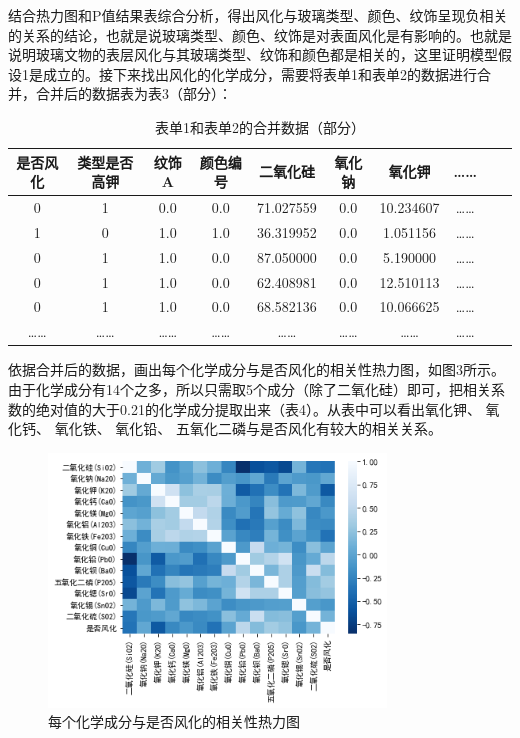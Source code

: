 \documentclass[withoutpreface,bwprint]{cumcmthesis}%
\begin{document}
	结合热力图和P值结果表综合分析，得出风化与玻璃类型、颜色、纹饰呈现负相关的关系的结论，也就是说玻璃类型、颜色、纹饰是对表面风化是有影响的。也就是说明玻璃文物的表层风化与其玻璃类型、纹饰和颜色都是相关的，这里证明模型假设1是成立的。接下来找出风化的化学成分，需要将表单1和表单2的数据进行合并，合并后的数据表为表3（部分）：
	
	\begin{table}[!htb]
		\centering
		\caption{表单1和表单2的合并数据（部分）}
		\begin{tabular}{cccccccccc}
			\toprule[1.5pt]
			是否风化 & 类型是否高钾&纹饰A&颜色编号&二氧化硅&氧化钠&氧化钾&……\\
			\midrule[1pt]
            0&1&0.0&0.0&71.027559 & 0.0&10.234607&……\\
            \hline
            1&0&1.0&1.0&36.319952&0.0&1.051156&……\\	
            \hline
            0&1&1.0&0.0&87.050000&0.0&5.190000&……\\	
            \hline
            0&1&1.0&0.0&62.408981&0.0&12.510113&……\\
            \hline
            0&1&1.0&0.0&68.582136&0.0&10.066625&……\\
            \hline
            …… &   ……     & ……    & ……& ……& ……& ……& …… \\
			\bottomrule[1.5pt]
		\end{tabular}
	\end{table}
	
	依据合并后的数据，画出每个化学成分与是否风化的相关性热力图，如图3所示。由于化学成分有14个之多，所以只需取5个成分（除了二氧化硅）即可，把相关系数的绝对值的大于0.21的化学成分提取出来（表4）。从表中可以看出氧化钾、 氧化钙、 氧化铁、 氧化铅、 五氧化二磷与是否风化有较大的相关关系。
	
	
	
	\begin{figure}[!h]
		\centering
		\includegraphics[width=0.8\textwidth]{ph3}
		\caption{每个化学成分与是否风化的相关性热力图}
		\label{fig:ph3}
	\end{figure}
	
\end{document}
